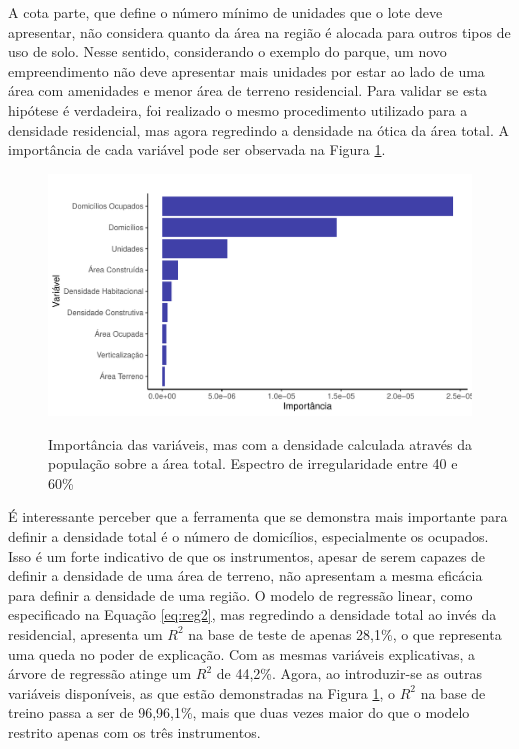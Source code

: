 A cota parte, que define o número mínimo de unidades que o lote deve apresentar, não considera quanto da área na região é alocada para outros tipos de uso de solo. Nesse sentido, considerando o exemplo do parque, um novo empreendimento não deve apresentar mais unidades por estar ao lado de uma área com amenidades e menor área de terreno residencial. Para validar se esta hipótese é verdadeira, foi realizado o mesmo procedimento utilizado para a densidade residencial, mas agora regredindo a densidade na ótica da área total. A importância de cada variável pode ser observada na Figura \ref{fig:importancia_densmod}.

\begin{figure}[h]
    \centering
    \caption{Importância das variáveis, mas com a densidade calculada através da população sobre a área total. Espectro de irregularidade entre 40 e 60\%}
    \includegraphics[width = .95\linewidth]{imagens/var_importance_densmod.pdf}
    \label{fig:importancia_densmod}
\end{figure}

É interessante perceber que a ferramenta que se demonstra mais importante para definir a densidade total é o número de domicílios, especialmente os ocupados. Isso é um forte indicativo de que os instrumentos, apesar de serem capazes de definir a densidade de uma área de terreno, não apresentam a mesma eficácia para definir a densidade de uma região. O modelo de regressão linear, como especificado na Equação \ref{eq:reg2}, mas regredindo a densidade total ao invés da residencial, apresenta um $R^2$ na base de teste de apenas 28,1\%, o que representa uma queda no poder de explicação. Com as mesmas variáveis explicativas, a árvore de regressão atinge um $R^2$ de 44,2\%. Agora, ao introduzir-se as outras variáveis disponíveis, as que estão demonstradas na Figura \ref{fig:importancia_densmod}, o $R^2$ na base de treino passa a ser de 96,96,1\%, mais que duas vezes maior do que o modelo restrito apenas com os três instrumentos. 

